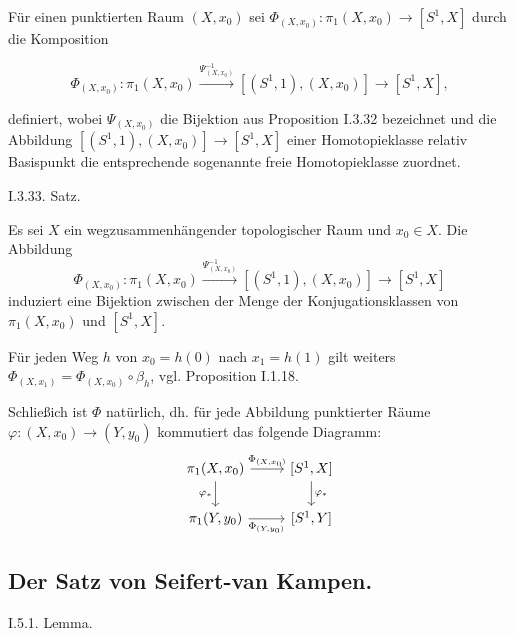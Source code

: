 \documentclass[10pt, letterpaper]{article}
\begin{document}
Für einen punktierten Raum $\left(X, x_{0}\right)$ sei $\Phi_{\left(X, x_{0}\right)}: \pi_{1}\left(X, x_{0}\right) \rightarrow\left[S^{1}, X\right]$ durch die Komposition

$$
\Phi_{\left(X, x_{0}\right)}: \pi_{1}\left(X, x_{0}\right) \xrightarrow{\Psi_{\left(X, x_{0}\right)}^{-1}}\left[\left(S^{1}, 1\right),\left(X, x_{0}\right)\right] \rightarrow\left[S^{1}, X\right],
$$

definiert, wobei $\Psi_{\left(X, x_{0}\right)}$ die Bijektion aus Proposition I.3.32 bezeichnet und die Abbildung $\left[\left(S^{1}, 1\right),\left(X, x_{0}\right)\right] \rightarrow\left[S^{1}, X\right]$ einer Homotopieklasse relativ Basispunkt die entsprechende sogenannte freie Homotopieklasse zuordnet.

I.3.33. Satz. 

Es sei $X$ ein wegzusammenhängender topologischer Raum und $x_0 \in X$. Die Abbildung 
$$\Phi_{\left(X, x_0\right)}: \pi_1\left(X, x_0\right) \xrightarrow{\Psi_{\left(X, x_0\right)}^{-1}}\left[\left(S^1, 1\right),\left(X, x_0\right)\right] \rightarrow\left[S^1, X\right]$$
induziert eine Bijektion zwischen der Menge der Konjugationsklassen von $\pi_1\left(X, x_0\right)$ und $\left[S^1, X\right]$. 

Für jeden Weg $h$ von $x_0=h(0)$ nach $x_1=h(1)$ gilt weiters $\Phi_{\left(X, x_1\right)}=\Phi_{\left(X, x_0\right)} \circ \beta_h$, vgl. Proposition I.1.18. 

Schließich ist $\Phi$ natürlich, dh. für jede Abbildung punktierter Räume $\varphi:\left(X, x_0\right) \rightarrow\left(Y, y_0\right)$ kommutiert das folgende Diagramm:
\[
\begin{tikzcd}
\pi_1(X, x_0) \arrow[r, "\Phi_{(X,x_0)}"] \arrow[d, "\varphi_*"'] & {[S^1, X]} \arrow[d, "\varphi_*"] \\
\pi_1(Y, y_0) \arrow[r, "\Phi_{(Y,y_0)}"'] & {[S^1, Y]}
\end{tikzcd}
\]



\subsection{Der Satz von Seifert-van Kampen.}



I.5.1. Lemma. 
\end{document}
